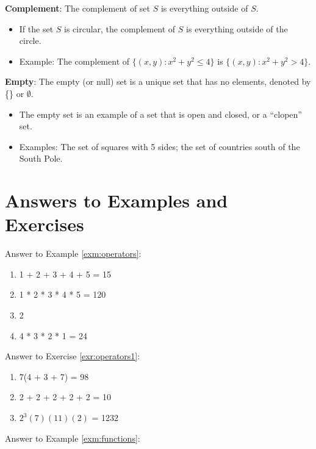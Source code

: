 \documentclass[]{book}
\providecommand{\tightlist}{%
  \setlength{\itemsep}{0pt}\setlength{\parskip}{0pt}}
\theoremstyle{definition}
\theoremstyle{definition}
\theoremstyle{definition}
\theoremstyle{remark}
\begin{document}
\textbf{Complement}: The complement of set \(S\) is everything outside of \(S\).

\begin{itemize}
\tightlist
\item
  If the set \(S\) is circular, the complement of \(S\) is everything outside of the circle.
\item
  Example: The complement of \(\{ (x,y) : x^2+y^2\le 4 \}\) is \(\{ (x,y) : x^2+y^2 > 4 \}\).
\end{itemize}

\textbf{Empty}: The empty (or null) set is a unique set that has no elements, denoted by \{\} or \(\emptyset\).

\begin{itemize}
\tightlist
\item
  The empty set is an example of a set that is open and closed, or a ``clopen'' set.
\item
  Examples: The set of squares with 5 sides; the set of countries south of the South Pole.
\end{itemize}

\hypertarget{answers-to-examples-and-exercises}{%
\section*{Answers to Examples and Exercises}\label{answers-to-examples-and-exercises}}

Answer to Example \ref{exm:operators}:

\begin{enumerate}
\def\labelenumi{\arabic{enumi}.}
\item
  1 + 2 + 3 + 4 + 5 = 15
\item
  1 * 2 * 3 * 4 * 5 = 120
\item
  2
\item
  4 * 3 * 2 * 1 = 24
\end{enumerate}

Answer to Exercise \ref{exr:operators1}:

\begin{enumerate}
\def\labelenumi{\arabic{enumi}.}
\item
  7(4 + 3 + 7) = 98
\item
  2 + 2 + 2 + 2 + 2 = 10
\item
  \(2^3(7)(11)(2)\) = 1232
\end{enumerate}

Answer to Example \ref{exm:functions}:
\end{document}
